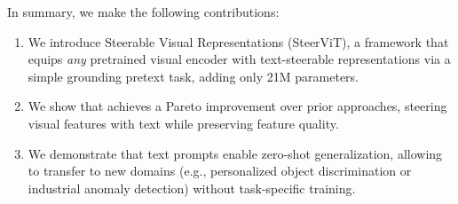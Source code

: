 


In summary, we make the following contributions:
\begin{enumerate}[nosep]
\item We introduce Steerable Visual Representations (SteerViT), a framework
that equips \textit{any} pretrained visual encoder with text-steerable representations via a simple grounding pretext task, adding only 21M parameters.
\item We show that \model{} achieves a Pareto improvement 
over prior approaches, steering visual features with text while preserving feature quality.
\item We demonstrate that text prompts enable zero-shot generalization, allowing \model{} to transfer to new domains (e.g., personalized object discrimination or industrial anomaly detection) without task-specific training.
\end{enumerate}


